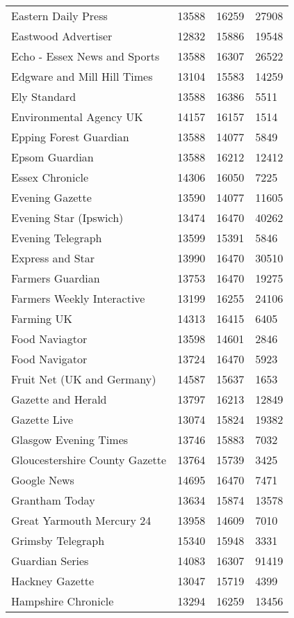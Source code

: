 \begin{longtable}{p{}p{}p{}p{}}
  Eastern Daily Press & 13588 & 16259 & 27908 \\ 
  Eastwood Advertiser & 12832 & 15886 & 19548 \\ 
  Echo - Essex News and Sports & 13588 & 16307 & 26522 \\ 
  Edgware and Mill Hill Times & 13104 & 15583 & 14259 \\ 
  Ely Standard & 13588 & 16386 & 5511 \\ 
  Environmental Agency UK & 14157 & 16157 & 1514 \\ 
  Epping Forest Guardian & 13588 & 14077 & 5849 \\ 
  Epsom Guardian & 13588 & 16212 & 12412 \\ 
  Essex Chronicle & 14306 & 16050 & 7225 \\ 
  Evening Gazette & 13590 & 14077 & 11605 \\ 
  Evening Star (Ipswich) & 13474 & 16470 & 40262 \\ 
  Evening Telegraph & 13599 & 15391 & 5846 \\ 
  Express and Star & 13990 & 16470 & 30510 \\ 
  Farmers Guardian & 13753 & 16470 & 19275 \\ 
  Farmers Weekly Interactive & 13199 & 16255 & 24106 \\ 
  Farming UK & 14313 & 16415 & 6405 \\ 
  Food Naviagtor & 13598 & 14601 & 2846 \\ 
  Food Navigator & 13724 & 16470 & 5923 \\ 
  Fruit Net (UK and Germany) & 14587 & 15637 & 1653 \\ 
  Gazette and Herald & 13797 & 16213 & 12849 \\ 
  Gazette Live & 13074 & 15824 & 19382 \\ 
  Glasgow Evening Times & 13746 & 15883 & 7032 \\ 
  Gloucestershire County Gazette & 13764 & 15739 & 3425 \\ 
  Google News & 14695 & 16470 & 7471 \\ 
  Grantham Today & 13634 & 15874 & 13578 \\ 
  Great Yarmouth Mercury 24 & 13958 & 14609 & 7010 \\ 
  Grimsby Telegraph & 15340 & 15948 & 3331 \\ 
  Guardian Series & 14083 & 16307 & 91419 \\ 
  Hackney Gazette & 13047 & 15719 & 4399 \\ 
  Hampshire Chronicle & 13294 & 16259 & 13456 \\ 

\end{longtable}
